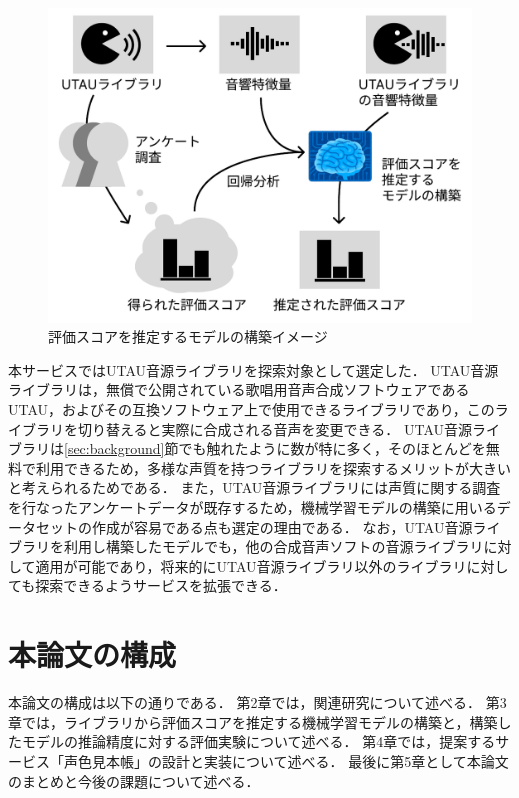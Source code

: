 \begin{figure}[htb]
  \centering
  \includegraphics[width=0.9\linewidth]{fig/fig2.pdf}
  \caption{評価スコアを推定するモデルの構築イメージ}
  \label{fig:fig2}
\end{figure}

本サービスではUTAU音源ライブラリを探索対象として選定した．
UTAU音源ライブラリは，無償で公開されている歌唱用音声合成ソフトウェアであるUTAU，およびその互換ソフトウェア上で使用できるライブラリであり，このライブラリを切り替えると実際に合成される音声を変更できる．
UTAU音源ライブラリは\ref{sec:background}節でも触れたように数が特に多く，そのほとんどを無料で利用できるため，多様な声質を持つライブラリを探索するメリットが大きいと考えられるためである．
また，UTAU音源ライブラリには声質に関する調査を行なったアンケートデータが既存するため，機械学習モデルの構築に用いるデータセットの作成が容易である点も選定の理由である．
なお，UTAU音源ライブラリを利用し構築したモデルでも，他の合成音声ソフトの音源ライブラリに対して適用が可能であり，将来的にUTAU音源ライブラリ以外のライブラリに対しても探索できるようサービスを拡張できる．

\section{本論文の構成}
本論文の構成は以下の通りである．
第2章では，関連研究について述べる．
第3章では，ライブラリから評価スコアを推定する機械学習モデルの構築と，構築したモデルの推論精度に対する評価実験について述べる．
第4章では，提案するサービス「声色見本帳」の設計と実装について述べる．
最後に第5章として本論文のまとめと今後の課題について述べる．

